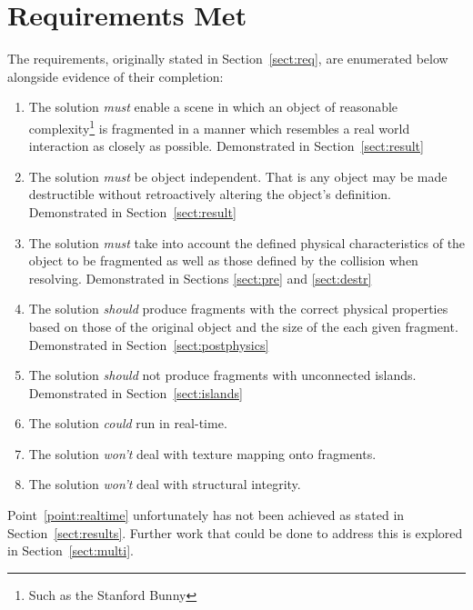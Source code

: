 \FloatBarrier

\section{Requirements Met}

The requirements, originally stated in Section~\ref{sect:req}, are enumerated below alongside evidence of their completion:

\begin{enumerate}
\item{The solution \emph{must} enable a scene in which an object of reasonable complexity\footnote{Such as the Stanford Bunny} is fragmented in a manner which resembles a real world interaction as closely as possible. Demonstrated in Section~\ref{sect:result}}
\label{point:complex}
\item{The solution \emph{must} be object independent. That is any object may be made destructible without retroactively altering the object's definition.  Demonstrated in Section~\ref{sect:result}}
\label{point:independant}
\item{The solution \emph{must} take into account the defined physical characteristics of the object to be fragmented as well as those defined by the collision when resolving.  Demonstrated in Sections \ref{sect:pre} and \ref{sect:destr}}
\label{point:physics}

\item{The solution \emph{should} produce fragments with the correct physical properties based on those of the original object and the size of the each given fragment.  Demonstrated in Section~\ref{sect:postphysics}}
\label{point:properties}
\item{The solution \emph{should} not produce fragments with unconnected islands.  Demonstrated in Section~\ref{sect:islands}}
\label{point:islands}

\item{The solution \emph{could} run in real-time.}
\label{point:realtime}

\item{The solution \emph{won't} deal with texture mapping onto fragments.}
\label{point:texture}
\item{The solution \emph{won't} deal with structural integrity.}
\label{point:structure}
\end{enumerate}

Point~\ref{point:realtime} unfortunately has not been achieved as stated in Section~\ref{sect:results}. Further work that could be done to address this is explored in Section~\ref{sect:multi}.

